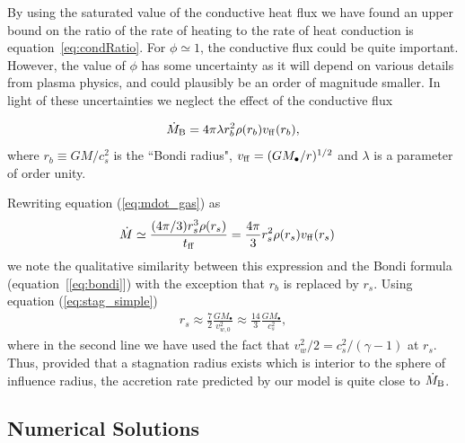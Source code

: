 \documentclass[usenatbib,fleqn]{mn2e}
\newcommand{\rs}{r_s}
\newcommand{\rb}{r_b}
\newcommand{\Mbh}[1][]{M_{\bullet#1}}
\newcommand{\ff}{\rm ff}
\newcommand{\vwO}{v_{w,0}}
\begin{document}
By using the saturated value of the conductive heat flux we have found
an upper bound on the ratio of the rate of heating to the rate of heat
conduction is equation~\eqref{eq:condRatio}.  For $\phi\simeq 1$, the
conductive flux could be quite important. However, the value of $\phi$
has some uncertainty as it will depend on various details from plasma
physics, and could plausibly be an order of magnitude smaller. In
light of these uncertainties we neglect the effect of the conductive flux

\begin{align}
  \dot{M}_{\rm B} =4\pi \lambda r_b^2 \rho(r_b) v_{\rm ff}(r_b),
\label{eq:bondi}
\end{align}
where $r_b \equiv GM/c_{s}^{2}$ is the ``Bondi radius", $v_{\rm ff} = (GM_{\bullet}/r)^{1/2}$ and $\lambda$ is a parameter of order unity.  

Rewriting equation (\ref{eq:mdot_gas}) as
\begin{align}
  &\dot{M}\simeq\frac{(4 \pi/3) \rs^3 \rho(\rs)}{t_{\ff}} =\frac{4 \pi}{3} \rs^2 \rho(\rs) v_{\ff}(\rs)
\end{align}
we note the qualitative similarity between this expression and the Bondi formula (equation~[\ref{eq:bondi}]) with the exception that $\rb$ is replaced by $\rs$.  Using equation (\ref{eq:stag_simple})
\begin{align}
  \rs\approx\frac{7}{2}\frac{G \Mbh}{\vwO^2} \approx \frac{14}{3}\frac{GM_{\bullet}}{c_{s}^{2}},
  \label{eq:rs_simple}
\end{align}
where in the second line we have used the fact that $v_{w}^{2}/2 =
c_s^2/(\gamma-1)$ at $\rs$.  Thus, provided that a stagnation radius
exists which is interior to the sphere of influence radius, the
accretion rate predicted by our model is quite close to $\dot{M}_{\rm
  B}$.



\subsection{Numerical Solutions}
\end{document}
